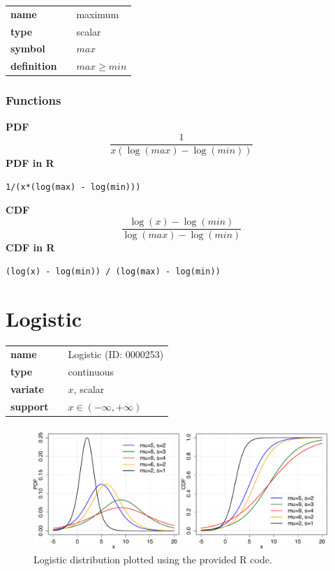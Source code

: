 \documentclass{article}
\begin{document}
\noindent\begin{tabular}{p{2cm}cl}
\textbf{name} & & maximum \\
\textbf{type} & & scalar \\
\textbf{symbol} & & $max$  \\
\textbf{definition} & & $max \geq min$
\end{tabular}
\subsubsection*{Functions}

\smallskip \noindent \hspace{.2cm} \textbf{PDF} 
\begin{equation*}\frac{1}{x(\log(max) - \log(min))}\end{equation*}
\smallskip \noindent \hspace{.2cm} \textbf{PDF in R}  
\begin{verbatim}1/(x*(log(max) - log(min)))\end{verbatim}
\smallskip \noindent \hspace{.2cm} \textbf{CDF} 
\begin{equation*}\frac{\log(x) - \log(min)}{\log(max) - \log(min)}\end{equation*}
\smallskip \noindent \hspace{.2cm} \textbf{CDF in R} 
\begin{verbatim}(log(x) - log(min)) / (log(max) - log(min))\end{verbatim}
\smallskip\section*{Logistic} 

  \bigskip 

\begin{tabular}{p{2cm}cl}
\textbf{name} & & Logistic (ID: 0000253)\\ 
 
\textbf{type} & & continuous \\ 

\textbf{variate} & & $x$, scalar \\ 

\textbf{support} & & $x \in (-\infty,+\infty)$
\end{tabular}

\begin{figure}[ht!]
\centering
  \includegraphics[width=140mm]{pics/Logistic.pdf}
 \caption{Logistic distribution plotted using the provided R code.}
 \label{fig:Logistic}
\end{figure}
\end{document}
